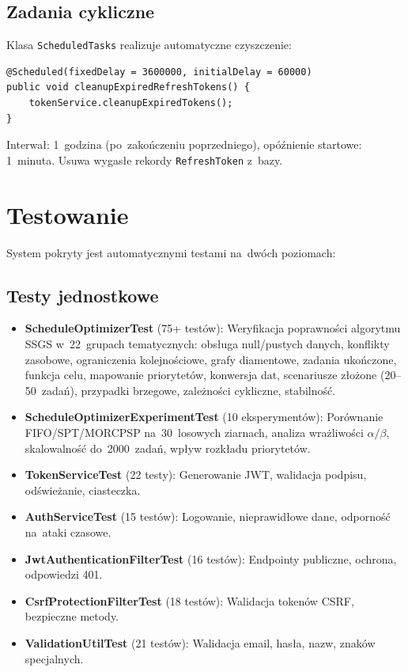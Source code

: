 \subsection{Zadania cykliczne}
\label{sec:scheduled_tasks}

Klasa \texttt{ScheduledTasks} realizuje automatyczne czyszczenie:

\begin{verbatim}
@Scheduled(fixedDelay = 3600000, initialDelay = 60000)
public void cleanupExpiredRefreshTokens() {
    tokenService.cleanupExpiredTokens();
}
\end{verbatim}

Interwał: 1~godzina (po~zakończeniu poprzedniego), opóźnienie startowe: 1~minuta. Usuwa wygasłe rekordy \texttt{RefreshToken} z~bazy.

\section{Testowanie}

System pokryty jest automatycznymi testami na~dwóch poziomach:

\subsection{Testy jednostkowe}

\begin{itemize}
    \item \textbf{ScheduleOptimizerTest} (75+ testów): Weryfikacja poprawności algorytmu SSGS w~22~grupach tematycznych: obsługa null/pustych danych, konflikty zasobowe, ograniczenia kolejnościowe, grafy diamentowe, zadania ukończone, funkcja celu, mapowanie priorytetów, konwersja dat, scenariusze złożone (20--50~zadań), przypadki brzegowe, zależności cykliczne, stabilność.

    \item \textbf{ScheduleOptimizerExperimentTest} (10 eksperymentów): Porównanie FIFO/SPT/MORCPSP na~30~losowych ziarnach, analiza wrażliwości $\alpha/\beta$, skalowalność do~2000~zadań, wpływ rozkładu priorytetów.

    \item \textbf{TokenServiceTest} (22 testy): Generowanie JWT, walidacja podpisu, odświeżanie, ciasteczka.

    \item \textbf{AuthServiceTest} (15 testów): Logowanie, nieprawidłowe dane, odporność na~ataki czasowe.

    \item \textbf{JwtAuthenticationFilterTest} (16 testów): Endpointy publiczne, ochrona, odpowiedzi 401.

    \item \textbf{CsrfProtectionFilterTest} (18 testów): Walidacja tokenów CSRF, bezpieczne metody.

    \item \textbf{ValidationUtilTest} (21 testów): Walidacja email, hasła, nazw, znaków specjalnych.
\end{itemize}

